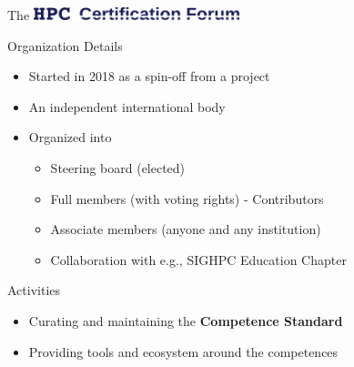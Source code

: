 \documentclass[compress,aspectratio=169]{beamer}
\begin{document}
\begin{frame}{The \includegraphics[width=0.45\textwidth]{hpccf-full}}

	\begin{block}{Organization Details}
		\begin{itemize}
			\item Started in 2018 as a spin-off from a project
      \item An independent international body
			\item Organized into
				\begin{itemize}
					\item Steering board (elected)
					\item Full members (with voting rights) - Contributors
					\item Associate members (anyone and any institution)
          \item Collaboration with e.g., SIGHPC Education Chapter
				\end{itemize}
		\end{itemize}
	\end{block}

	\begin{block}{Activities}
		\begin{itemize}
			\item Curating and maintaining the \textbf{Competence Standard}
			\item Providing tools and ecosystem around the competences
		\end{itemize}
	\end{block}
\end{frame}
\end{document}
